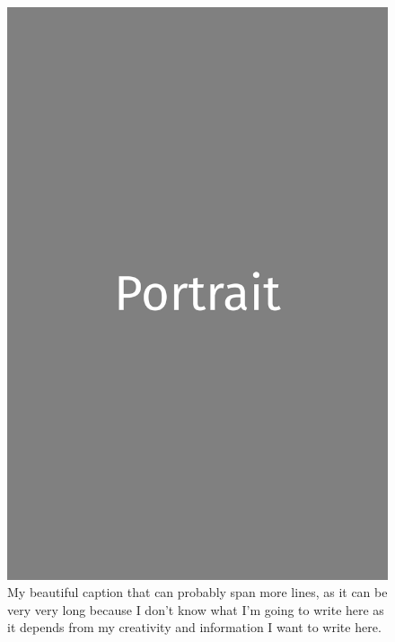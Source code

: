 \documentclass[a4paper,twoside]{book}
\begin{document}
\begin{figure}[H]
	\includegraphics[width=\textwidth]{portrait.png}
	\caption{My beautiful caption that can probably span more lines, as it can be very very long because I don't know what I'm going to write here as it depends from my creativity and information I want to write here.}
\end{figure}

\clearpage
\end{document}
